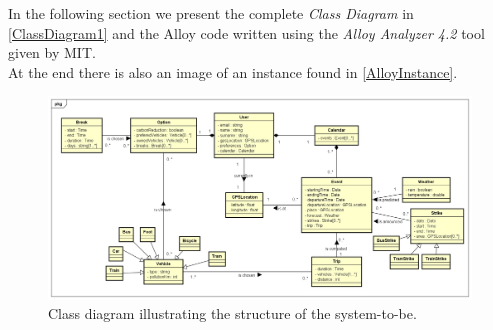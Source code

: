 In the following section we present the complete \emph{Class Diagram} in \autoref{ClassDiagram1} and the Alloy code written using the \emph{Alloy Analyzer 4.2} tool given by MIT.\\
At the end there is also an image of an instance found in \autoref{AlloyInstance}.

\begin{figure}[H]
\begin{center}
		\includegraphics[width=\textwidth, angle=90,keepaspectratio=true]{Img/ClassDiagram1}
		\caption{Class diagram illustrating the structure of the system-to-be.}
		\label{ClassDiagram1}
\end{center}
\end{figure}

\newpage
{}


\vfill
